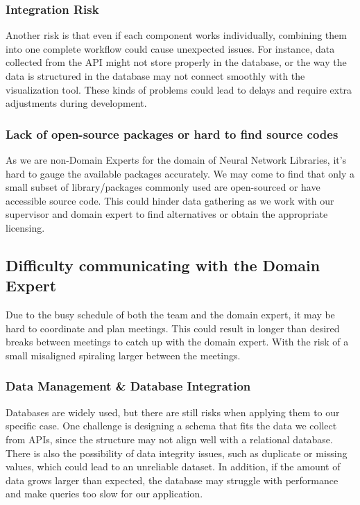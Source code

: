 \documentclass{article}
\begin{document}
\subsubsection*{Integration Risk}\vspace{-0.5em}
Another risk is that even if each component works individually, combining them into one complete workflow could cause unexpected issues. For instance, data collected from the API might not store properly in the database, or the way the data is structured in the database may not connect smoothly with the visualization tool. These kinds of problems could lead to delays and require extra adjustments during development.

\subsubsection*{Lack of open-source packages or hard to find source codes}\vspace{-0.5em}
As we are non-Domain Experts for the domain of Neural Network Libraries, it's hard to gauge the available packages accurately. We may come to find that only a small subset of library/packages commonly used
are open-sourced or have accessible source code. This could hinder data gathering as we work with our supervisor and domain expert to find alternatives or obtain the appropriate licensing.

\subsection*{Difficulty communicating with the Domain Expert}\vspace{-0.5em}
Due to the busy schedule of both the team and the domain expert, it may be hard to coordinate and plan meetings. This could result in longer than desired breaks between meetings to catch up with the domain expert.
With the risk of a small misaligned spiraling larger between the meetings.

\subsubsection*{Data Management \& Database Integration}\vspace{-0.5em}
Databases are widely used, but there are still risks when applying them to our specific case. One challenge is designing a schema that fits the data we collect from APIs, since the structure may not align well with a relational database. There is also the possibility of data integrity issues, such as duplicate or missing values, which could lead to an unreliable dataset. In addition, if the amount of data grows larger than expected, the database may struggle with performance and make queries too slow for our application.
\end{document}
